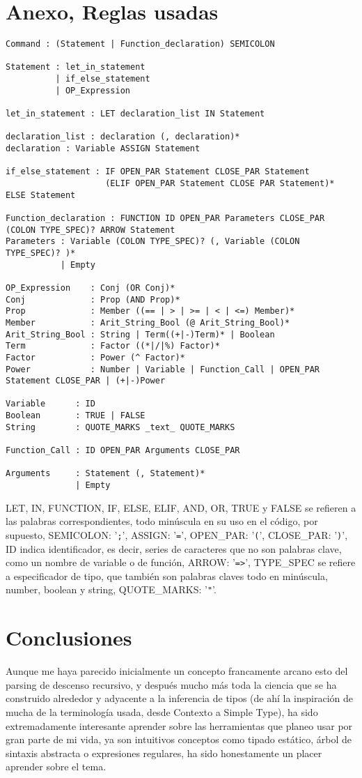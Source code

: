 \documentclass{article}
\begin{document}
\newpage

\section{Anexo, Reglas usadas}

\begin{verbatim}
Command : (Statement | Function_declaration) SEMICOLON

Statement : let_in_statement
          | if_else_statement
          | OP_Expression

let_in_statement : LET declaration_list IN Statement

declaration_list : declaration (, declaration)*
declaration : Variable ASSIGN Statement

if_else_statement : IF OPEN_PAR Statement CLOSE_PAR Statement 
                    (ELIF OPEN_PAR Statement CLOSE PAR Statement)* ELSE Statement

Function_declaration : FUNCTION ID OPEN_PAR Parameters CLOSE_PAR (COLON TYPE_SPEC)? ARROW Statement
Parameters : Variable (COLON TYPE_SPEC)? (, Variable (COLON TYPE_SPEC)? )*
           | Empty

OP_Expression    : Conj (OR Conj)*
Conj             : Prop (AND Prop)*
Prop             : Member ((== | > | >= | < | <=) Member)*
Member           : Arit_String_Bool (@ Arit_String_Bool)*
Arit_String_Bool : String | Term((+|-)Term)* | Boolean
Term             : Factor ((*|/|%) Factor)*
Factor           : Power (^ Factor)*
Power            : Number | Variable | Function_Call | OPEN_PAR Statement CLOSE_PAR | (+|-)Power

Variable      : ID
Boolean       : TRUE | FALSE
String        : QUOTE_MARKS _text_ QUOTE_MARKS

Function_Call : ID OPEN_PAR Arguments CLOSE_PAR

Arguments     : Statement (, Statement)*
              | Empty
\end{verbatim}

LET, IN, FUNCTION, IF, ELSE, ELIF, AND, OR, TRUE y FALSE se refieren a las palabras correspondientes, todo minúscula en su uso en el código, por supuesto, SEMICOLON: '\texttt{;}', ASSIGN: '\texttt{=}', OPEN\_PAR: '\texttt{(}', CLOSE\_PAR: '\texttt{)}', ID indica identificador, es decir, series de caracteres que no son palabras clave, como un nombre de variable o de función, ARROW: '\texttt{=>}', TYPE\_SPEC se refiere a especificador de tipo, que también son palabras claves todo en minúscula, number, boolean y string, QUOTE\_MARKS: '\texttt{"}'.

\section*{Conclusiones}
Aunque me haya parecido inicialmente un concepto francamente arcano esto del parsing de descenso recursivo, y después mucho más toda la ciencia que se ha construido alrededor y adyacente a la inferencia de tipos (de ahí la inspiración de mucha de la terminología usada, desde Contexto a Simple Type), ha sido extremadamente interesante aprender sobre las herramientas que planeo usar por gran parte de mi vida, ya son intuitivos conceptos como tipado estático, árbol de sintaxis abstracta o expresiones regulares, ha sido honestamente un placer aprender sobre el tema.
\end{document}
